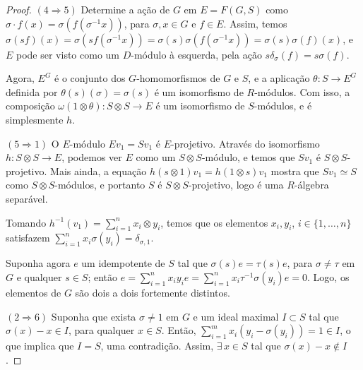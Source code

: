 \begin{teo}
\begin{proof}
$(4\Rightarrow 5)$
Determine a ação de $G$ em $E=F(G,S)$ como $\sigma\cdot f (x)=\sigma(f(\sigma^{-1}x))$, para $\sigma,x \in G$ e $f \in E$. Assim, temos $\sigma(sf)(x)=\sigma(sf(\sigma^{-1}x))=\sigma(s)\sigma(f(\sigma^{-1}x))=\sigma(s)\sigma(f)(x)$, e $E$ pode ser visto como um $D$-módulo à esquerda, pela ação $s\delta_\sigma(f)=s\sigma(f)$. \par Agora, $E^G$ é o conjunto dos $G$-homomorfismos de $G$ e $S$, e a aplicação $\theta: S \rightarrow E^G$ definida por $\theta (s)(\sigma)=\sigma(s)$ é um isomorfismo de $R$-módulos. Com isso, a composição $\omega(1\otimes \theta): S\otimes S \rightarrow E$ é um isomorfismo de $S$-módulos, e é simplesmente $h$. \par



$(5\Rightarrow 1)$
O $E$-módulo $Ev_1=Sv_1$ é $E$-projetivo. Através do isomorfismo $h: S\otimes S \rightarrow E$, podemos ver $E$ como um $S\otimes S$-módulo, e temos que $Sv_1$ é $S\otimes S$-projetivo. Mais ainda, a equação $h(s\otimes1)v_1 = h(1\otimes s)v_1$ mostra que $Sv_1 \simeq S$ como $S\otimes S$-módulos, e portanto $S$ é $S\otimes S$-projetivo, logo é uma $R$-álgebra separável.\par
Tomando $h^{-1}(v_1) = \sum_{i=1}^{n}x_i \otimes y_i$, temos que os elementos $x_i, y_i$, $i\in \{1,\dots, n\}$ satisfazem $\sum_{i=1}^{n}x_i \sigma(y_i) = \delta_{\sigma,1}$. \par
Suponha agora $e$ um idempotente de $S$ tal que $\sigma(s)e=\tau(s)e$, para $\sigma\neq \tau$ em $G$ e qualquer $s \in S$; então $e=\sum_{i=1}^{n}x_iy_i e=\sum_{i=1}^{n}x_i \tau^{-1}\sigma(y_i) e = 0$. Logo, os elementos de $G$ são dois a dois fortemente distintos. \par 



$(2\Rightarrow 6)$
Suponha que exista $\sigma\neq 1$ em $G$ e um ideal maximal $I \subset S$ tal que $\sigma(x)-x \in I$, para qualquer $x \in S$. Então, $\sum_{i=1}^{m}x_i(y_i-\sigma(y_i))=1 \in I$, o que implica que $I =S$, uma contradição. Assim, $\exists \, x \in S$ tal que $\sigma(x)-x \not\in I$. \par




\end{proof}
\end{teo}
